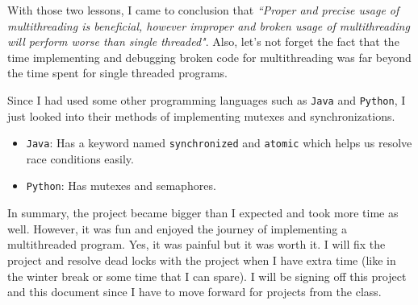 \documentclass{homework}
\begin{document}
With those two lessons, I came to conclusion that \textit{“Proper and precise usage of multithreading is beneficial, however improper and broken usage of multithreading will perform worse than single threaded"}. Also, let's not forget the fact that the time implementing and debugging broken code for multithreading was far beyond the time spent for single threaded programs.
\par

Since I had used some other programming languages such as \texttt{Java} and \texttt{Python}, I just looked into their methods of implementing mutexes and synchronizations.
\begin{itemize}
    \item \texttt{Java}: Has a keyword named \texttt{synchronized} and \texttt{atomic} which helps us resolve race conditions easily. 
    \item \texttt{Python}: Has mutexes and semaphores.
\end{itemize}

In summary, the project became bigger than I expected and took more time as well. However, it was fun and enjoyed the journey of implementing a multithreaded program. Yes, it was painful but it was worth it. I will fix the project and resolve dead locks with the project when I have extra time (like in the winter break or some time that I can spare). I will be signing off this project and this document since I have to move forward for projects from the class. 
\end{document}
